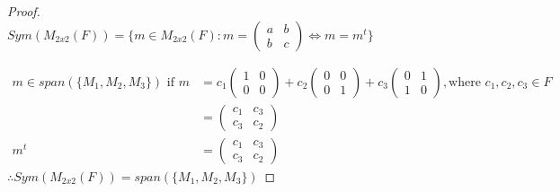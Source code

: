 \documentclass[11pt]{scrartcl}
\makeatletter
\newenvironment{Dequation}
  {%
  \def\tagform@##1{%
    \maketag@@@{\makebox[0pt][r]{(\ignorespaces##1\unskip\@@italiccorr)}}}%
  \ignorespaces
  }
  {%
  \def\tagform@##1{\maketag@@@{(\ignorespaces##1\unskip\@@italiccorr)}}%
  \ignorespacesafterend
  }
\makeatother
\begin{document}
\begin{proof}
	\-\\
	$Sym(M_{2x2}(F)) = \{m \in M_{2x2}(F): m = \begin{pmatrix} a & b \\ b & c \end{pmatrix}  \Leftrightarrow m = m^t\}$
	\begin{Dequation}
	\begin{align*}
		m \in span(\{M_1, M_2, M_3\}) \text{ if } m & = c_1 
	\begin{pmatrix}
	1 & 0 \\
	0 & 0 
	\end{pmatrix}+
	c_2
	\begin{pmatrix}
	0 & 0 \\
	0 & 1 
	\end{pmatrix}+
	c_3
	\begin{pmatrix}
	0 & 1 \\
	1 & 0 
	\end{pmatrix}, \text{where } c_1, c_2, c_3 \in F\\
	& =\begin{pmatrix}
	c_1 & c_3 \\
	c_3 & c_2 
	\end{pmatrix}\\
		m^t & = 
	\begin{pmatrix}
	c_1 & c_3 \\
	c_3 & c_2 
	\end{pmatrix}
	\end{align*}
	\end{Dequation}
	$\therefore Sym(M_{2x2}(F)) = span(\{M_1, M_2, M_3\})$
\end{proof}
\end{document}
